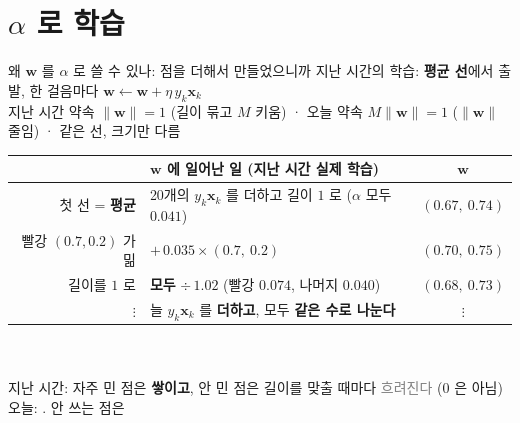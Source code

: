 \documentclass[aspectratio=169,11pt,t]{beamer}
\begin{document}
\section{$\alpha$ 로 학습}
\begin{frame}{왜 $\mathbf{w}$ 를 $\alpha$ 로 쓸 수 있나: 점을 더해서 만들었으니까}
\vfill
\centering
{\large 지난 시간의 학습: \; \textbf{평균 선}에서 출발, 한 걸음마다 \; $\mathbf{w} \leftarrow \mathbf{w} + \eta\, y_k \mathbf{x}_k$}\\[0.1em]
{\scriptsize\color{gray} 지난 시간 약속 $\lVert\mathbf{w}\rVert = 1$ (길이 묶고 $M$ 키움) \; · \; 오늘 약속 $M\lVert\mathbf{w}\rVert = 1$ ($\lVert\mathbf{w}\rVert$ 줄임) \; · \; 같은 선, 크기만 다름}\\[0.4em]
\renewcommand{\arraystretch}{1.05}
{\large\begin{tabular}{r|l|c}
 & $\mathbf{w}$ 에 일어난 일 (지난 시간 실제 학습) & $\mathbf{w}$\\ \hline
첫 선 = \textbf{평균} & 20개의 $y_k \mathbf{x}_k$ 를 더하고 길이 $1$ 로 \;($\alpha$ 모두 $0.041$) & $(0.67,\ 0.74)$\\
\textcolor{ksared}{빨강 $(0.7, 0.2)$} 가 밂 & $+\,0.035 \times (0.7,\ 0.2)$ & $(0.70,\ 0.75)$\\
길이를 $1$ 로 & \textbf{모두} $\div\, 1.02$ \;(\textcolor{ksared}{빨강} $0.074$, 나머지 $0.040$) & $(0.68,\ 0.73)$\\
$\vdots$ & 늘 $y_k \mathbf{x}_k$ 를 \textbf{더하고}, 모두 \textbf{같은 수로 나눈다} & $\vdots$
\end{tabular}}\\[0.3em]
\\[0.25em]
{\normalsize 지난 시간: 자주 민 점은 \textbf{쌓이고}, 안 민 점은 길이를 맞출 때마다 \textcolor{gray}{흐려진다} (0 은 아님)}\\[0.2em]
{\large 오늘: . 안 쓰는 점은 }
\vfill

\end{frame}
\end{document}
